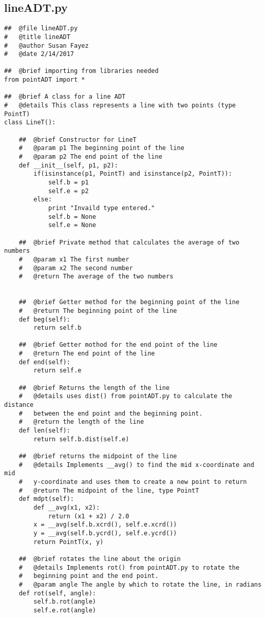 \documentclass{article}
\begin{document}
\subsection{lineADT.py}
\begin{lstlisting}
##  @file lineADT.py
#   @title lineADT
#   @author Susan Fayez
#   @date 2/14/2017

##  @brief importing from libraries needed
from pointADT import *

##  @brief A class for a line ADT
#   @details This class represents a line with two points (type PointT)
class LineT():
    
    ##  @brief Constructor for LineT
    #   @param p1 The beginning point of the line 
    #   @param p2 The end point of the line
    def __init__(self, p1, p2):
        if(isinstance(p1, PointT) and isinstance(p2, PointT)):
            self.b = p1
            self.e = p2
        else:
            print "Invaild type entered."
            self.b = None
            self.e = None

    ##  @brief Private method that calculates the average of two numbers
    #   @param x1 The first number
    #   @param x2 The second number
    #   @return The average of the two numbers
    

    ##  @brief Getter method for the beginning point of the line 
    #   @return The beginning point of the line
    def beg(self):
        return self.b

    ##  @brief Getter mothod for the end point of the line 
    #   @return The end point of the line
    def end(self):
        return self.e

    ##  @brief Returns the length of the line 
    #   @details uses dist() from pointADT.py to calculate the distance 
    #   between the end point and the beginning point.
    #   @return the length of the line
    def len(self):
        return self.b.dist(self.e)

    ##  @brief returns the midpoint of the line 
    #   @details Implements __avg() to find the mid x-coordinate and mid 
    #   y-coordinate and uses them to create a new point to return
    #   @return The midpoint of the line, type PointT
    def mdpt(self):
        def __avg(x1, x2):
            return (x1 + x2) / 2.0
        x = __avg(self.b.xcrd(), self.e.xcrd())
        y = __avg(self.b.ycrd(), self.e.ycrd())
        return PointT(x, y)

    ##  @brief rotates the line about the origin
    #   @details Implements rot() from pointADT.py to rotate the 
    #   beginning point and the end point.
    #   @param angle The angle by which to rotate the line, in radians
    def rot(self, angle):
        self.b.rot(angle)
        self.e.rot(angle)

\end{lstlisting}
\end{document}
